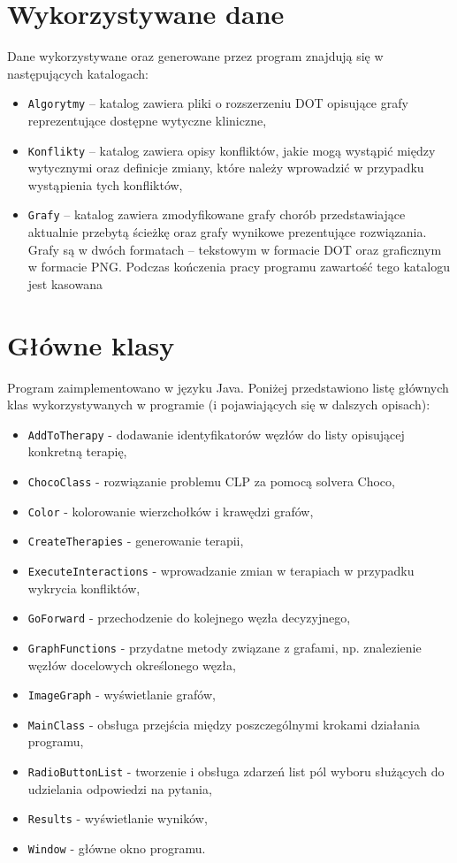 \section{Wykorzystywane dane}


Dane wykorzystywane oraz generowane przez program znajdują się w następujących katalogach:
\begin{itemize}
\item{\texttt{Algorytmy} – katalog zawiera pliki o rozszerzeniu DOT opisujące grafy reprezentujące dostępne wytyczne kliniczne,}
\item{\texttt{Konflikty} – katalog zawiera opisy konfliktów, jakie mogą wystąpić między wytycznymi oraz definicje zmiany, które należy wprowadzić w przypadku wystąpienia tych konfliktów,}
\item{\texttt{Grafy} – katalog zawiera zmodyfikowane grafy chorób przedstawiające aktualnie przebytą ścieżkę oraz grafy wynikowe prezentujące rozwiązania. Grafy są w dwóch formatach – tekstowym w formacie DOT oraz graficznym w formacie PNG. Podczas kończenia pracy programu zawartość tego katalogu jest kasowana}
\end{itemize}

\section{Główne klasy}
Program zaimplementowano w języku Java. Poniżej przedstawiono listę głównych klas wykorzystywanych w programie (i pojawiających się w dalszych opisach):
\begin{itemize}
\item{\texttt{AddToTherapy} - dodawanie identyfikatorów węzłów do listy opisującej konkretną terapię,}
\item{\texttt{ChocoClass} - rozwiązanie problemu CLP za pomocą solvera Choco,}
\item{\texttt{Color} - kolorowanie wierzchołków i krawędzi grafów,}
\item{\texttt{CreateTherapies} - generowanie terapii,}
\item{\texttt{ExecuteInteractions} - wprowadzanie zmian w terapiach w przypadku wykrycia konfliktów, }
\item{\texttt{GoForward} - przechodzenie do kolejnego węzła decyzyjnego, }
\item{\texttt{GraphFunctions} - przydatne metody związane z grafami, np. znalezienie węzłów docelowych określonego węzła,}
\item{\texttt{ImageGraph} - wyświetlanie grafów, }
\item{\texttt{MainClass} - obsługa przejścia między poszczególnymi krokami działania programu,}
\item{\texttt{RadioButtonList} - tworzenie i obsługa zdarzeń list pól wyboru służących do udzielania odpowiedzi na pytania,}
\item{\texttt{Results} - wyświetlanie wyników,}
\item{\texttt{Window} - główne okno programu.}
\end{itemize}

